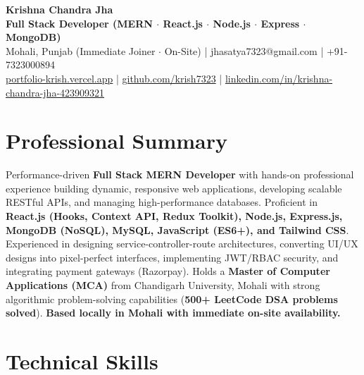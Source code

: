\documentclass[a4paper,10pt]{article}
\begin{document}
\begin{center}

    {\LARGE \textbf{Krishna Chandra Jha}} \\[2.5pt]

    \textbf{Full Stack Developer (MERN $\cdot$ React.js $\cdot$ Node.js $\cdot$ Express $\cdot$ MongoDB)} \\[3.5pt]

    Mohali, Punjab (Immediate Joiner $\cdot$ On-Site)
    \quad | \quad
    jhasatya7323@gmail.com
    \quad | \quad
    +91-7323000894
    \\[2.5pt]

    \href{https://portfolio-ashen-alpha-dv0whhsamo.vercel.app/}{portfolio-krish.vercel.app}
    \quad | \quad
    \href{https://github.com/krish7323}{github.com/krish7323}
    \quad | \quad
    \href{https://linkedin.com/in/krishna-chandra-jha-423909321}
    {linkedin.com/in/krishna-chandra-jha-423909321}

\end{center}

\section*{Professional Summary}

Performance-driven \textbf{Full Stack MERN Developer} with hands-on professional experience building dynamic, responsive web applications, developing scalable RESTful APIs, and managing high-performance databases. Proficient in \textbf{React.js (Hooks, Context API, Redux Toolkit), Node.js, Express.js, MongoDB (NoSQL), MySQL, JavaScript (ES6+), and Tailwind CSS}. Experienced in designing service-controller-route architectures, converting UI/UX designs into pixel-perfect interfaces, implementing JWT/RBAC security, and integrating payment gateways (Razorpay). Holds a \textbf{Master of Computer Applications (MCA)} from Chandigarh University, Mohali with strong algorithmic problem-solving capabilities (\textbf{500+ LeetCode DSA problems solved}). \textbf{Based locally in Mohali with immediate on-site availability.}

\section*{Technical Skills}
\end{document}
